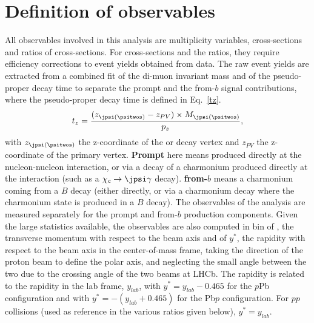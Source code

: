 \section{Definition of observables}
\label{Observables}
\def\effTot{\ensuremath{\epsilon_{\mathrm{tot}}}\xspace}
\def\effAcc{\ensuremath{\epsilon_{\mathrm{acc}}}\xspace}
\def\effReco{\ensuremath{\epsilon_{\mathrm{Reco\&Sel}}}\xspace}
\def\effID{\ensuremath{\epsilon_{\mathrm{MuonID}}}\xspace}
\def\effTrigger{\ensuremath{\epsilon_{\mathrm{Trigger}}}\xspace}
All observables involved in this analysis are multiplicity variables, cross-sections and ratios of cross-sections. For cross-sections and the ratios, they require efficiency corrections to event yields obtained from data. The raw event yields are extracted from a combined fit of the di-muon invariant mass and of the pseudo-proper decay time to separate the prompt and the from-$b$ signal contributions, where the pseudo-proper decay time is defined in Eq.~\ref{tz}.
\begin{equation}
	t_z=\frac{(z_{\jpsi(\psitwos)}-z_{PV})\times M_{\jpsi(\psitwos)}}{p_z},   
\label{tz}
\end{equation}
with $z_{\jpsi(\psitwos)}$ the z-coordinate of the \jpsi or \psitwos decay vertex and $z_{PV}$ the z-coordinate of the primary vertex.
\textbf{Prompt} here means produced directly at the nucleon-nucleon interaction, or via a decay of a charmonium produced directly at the interaction (such as a $\chi_c\rightarrow \jpsi \gamma$ decay). \textbf{from-$b$} means a charmonium coming from a $B$ decay (either directly, or via a charmonium decay where the charmonium state is produced in a $B$ decay). The observables of the analysis are measured separately for the prompt and from-$b$ production components. Given the large statistics available, the observables are also computed in bin of \pt, the transverse momentum with respect to the beam axis and of $y^*$, the rapidity with respect to the beam axis in the center-of-mass frame, taking the direction of the proton beam to define the polar axis, and neglecting the small angle between the two due to the crossing angle of the two beams at LHCb. The rapidity is related to the rapidity in the lab frame, $y_{lab}$, with $y^* = y_{lab} - 0.465$ for the $p$Pb configuration and with $y^* = -(y_{lab} + 0.465)$ for the Pb$p$ configuration. For $pp$ collisions (used as reference in the various ratios given below), $y^*=y_{lab}$.

